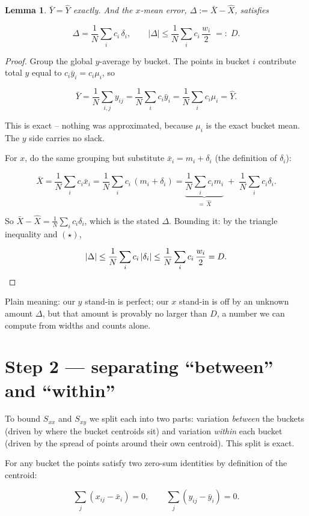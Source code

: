 \documentclass[11pt]{article}
\newtheorem{lemma}{Lemma}
\begin{document}
\begin{lemma}\label{lem:means}
$\bar Y=\hat Y$ exactly. And the $x$-mean error,
$\Delta:=\bar X-\hat X$, satisfies

\[
\Delta=\frac1N\sum_i c_i\,\delta_i,
\qquad
|\Delta|\le \frac1N\sum_i c_i\,\frac{w_i}{2}\;=:\;D.
\]
\end{lemma}

\begin{proof}
Group the global $y$-average by bucket. The points in bucket $i$
contribute total $y$ equal to $c_i\bar y_i=c_i\mu_i$, so

\[
\bar Y=\frac1N\sum_{i,j}y_{ij}
      =\frac1N\sum_i c_i\bar y_i
      =\frac1N\sum_i c_i\mu_i
      =\hat Y.
\]

This is exact -- nothing was approximated, because $\mu_i$ is the exact
bucket mean. The $y$ side carries no slack.

For $x$, do the same grouping but substitute
$\bar x_i = m_i + \delta_i$ (the definition of $\delta_i$):

\[
\bar X=\frac1N\sum_i c_i\bar x_i
      =\frac1N\sum_i c_i\,(m_i+\delta_i)
      =\underbrace{\frac1N\sum_i c_i m_i}_{=\,\hat X}
      \;+\;\frac1N\sum_i c_i\delta_i .
\]

So $\bar X-\hat X=\frac1N\sum_i c_i\delta_i$, which is the stated
$\Delta$. Bounding it: by the triangle inequality and $(\star)$,

\[
|\Delta|\le\frac1N\sum_i c_i\,|\delta_i|
        \le\frac1N\sum_i c_i\,\frac{w_i}{2}=D. \qedhere
\]
\end{proof}

\noindent Plain meaning: our $y$ stand-in is perfect; our $x$ stand-in
is off by an unknown amount $\Delta$, but that amount is provably no
larger than $D$, a number we can compute from widths and counts alone.

\section{Step 2 --- separating ``between'' and ``within''}

To bound $S_{xx}$ and $S_{xy}$ we split each into two parts: variation
\emph{between} the buckets (driven by where the bucket centroids sit)
and variation \emph{within} each bucket (driven by the spread of points
around their own centroid). This split is exact.

For any bucket the points satisfy two zero-sum identities by definition
of the centroid:

\[
\sum_{j}(x_{ij}-\bar x_i)=0,
\qquad
\sum_{j}(y_{ij}-\bar y_i)=0.
\]
\end{document}

